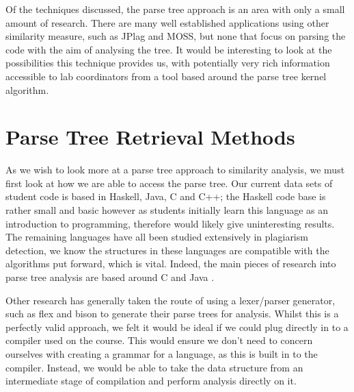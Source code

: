 Of the techniques discussed, the parse tree approach is an area with only a small
amount of research. There are many well established applications using other
similarity measure, such as JPlag\cite{JPlag} and MOSS\cite{winnowing}, 
but none that focus on parsing the code with the aim of
analysing the tree. It would be interesting to look at the possibilities this
technique provides us, with potentially very rich information accessible to
lab coordinators from a tool based around the parse tree kernel algorithm.

\label{sec:parseTreeKernel}

\section{Parse Tree Retrieval Methods}

As we wish to look more at a parse tree approach to similarity analysis, we must
first look at how we are able to access the parse tree. Our current data sets of
student code is based in Haskell, Java, C and C++; the Haskell code base is rather
small and basic however as students initially learn this language as an introduction
to programming, therefore would likely give uninteresting results. The remaining
languages have all been studied extensively in plagiarism detection, we know the
structures in these languages are compatible with the algorithms put forward,
which is vital. Indeed, the main pieces of research into parse tree analysis
are based around C \cite{Belkhouche} and Java \cite{ParseTreeKernel}.

Other research has generally taken the route of using a lexer/parser generator,
such as flex\cite{flex} and bison\cite{bison} to generate their parse trees
for analysis. Whilst this is a perfectly valid approach, we felt it would be
ideal if we could plug directly in to a compiler used on the course. This
would ensure we don't need to concern ourselves with creating a grammar for a
language, as this is built in to the compiler. Instead, we would be able to
take the data structure from an intermediate stage of compilation and perform
analysis directly on it.

